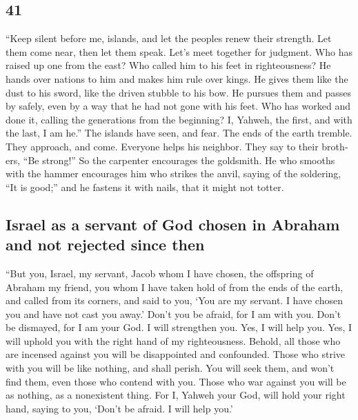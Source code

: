 \begin{paracol}{2}
\begin{otherlanguage}{english}
\hypertarget{section-81}{%
\section{41}\label{section-81}}

 ``Keep silent before me, islands, and let the peoples
renew their strength. Let them come near, then let them speak. Let's
meet together for judgment.  Who has raised up one from
the east? Who called him to his feet in righteousness? He hands over
nations to him and makes him rule over kings. He gives them like the
dust to his sword, like the driven stubble to his bow.  He
pursues them and passes by safely, even by a way that he had not gone
with his feet.  Who has worked and done it, calling the
generations from the beginning? I, Yahweh, the first, and with the last,
I am he.''  The islands have seen, and fear. The ends of
the earth tremble. They approach, and come.  Everyone
helps his neighbor. They say to their brothers, ``Be strong!''
 So the carpenter encourages the goldsmith. He who smooths
with the hammer encourages him who strikes the anvil, saying of the
soldering, ``It is good;'' and he fastens it with nails, that it might
not totter.

\hypertarget{israel-as-a-servant-of-god-chosen-in-abraham-and-not-rejected-since-then}{%
\subsection{Israel as a servant of God chosen in Abraham and not
rejected since
then}\label{israel-as-a-servant-of-god-chosen-in-abraham-and-not-rejected-since-then}}

 ``But you, Israel, my servant, Jacob whom I have chosen,
the offspring of Abraham my friend,  you whom I have taken
hold of from the ends of the earth, and called from its corners, and
said to you, `You are my servant. I have chosen you and have not cast
you away.'  Don't you be afraid, for I am with you. Don't
be dismayed, for I am your God. I will strengthen you. Yes, I will help
you. Yes, I will uphold you with the right hand of my righteousness.
 Behold, all those who are incensed against you will be
disappointed and confounded. Those who strive with you will be like
nothing, and shall perish.  You will seek them, and won't
find them, even those who contend with you. Those who war against you
will be as nothing, as a nonexistent thing.  For I,
Yahweh your God, will hold your right hand, saying to you, `Don't be
afraid. I will help you.'


\end{otherlanguage}
\end{paracol}
